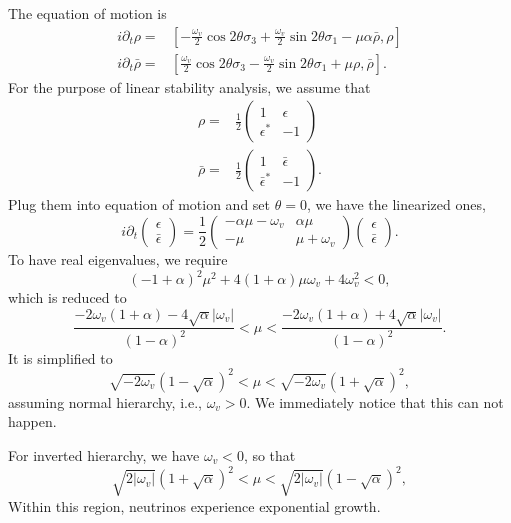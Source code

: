 The equation of motion is
\begin{align*}
   i\partial_t \rho =& \left[ -\frac{\omega_v}{2} \cos2\theta \sigma_3 + \frac{\omega_v}{2}\sin 2\theta \sigma_1 - \mu \alpha \bar \rho , \rho\right] \\
   i\partial_t \bar\rho =& \left[ \frac{\omega_v}{2} \cos2\theta \sigma_3 - \frac{\omega_v}{2}\sin 2\theta \sigma_1 + \mu \rho , \bar\rho\right].
\end{align*}
For the purpose of linear stability analysis, we assume that
\begin{align*}
   \rho =& \frac{1}{2}\begin{pmatrix}
   1 & \epsilon \\
   \epsilon^* & -1
   \end{pmatrix} \\
   \bar\rho =& \frac{1}{2}\begin{pmatrix}
   1 & \bar\epsilon \\
   \bar \epsilon^* & -1
   \end{pmatrix}.
\end{align*}
Plug them into equation of motion and set $\theta=0$, we have the linearized ones,
\begin{equation*}
   i\partial_t \begin{pmatrix}
   \epsilon \\
   \bar\epsilon
   \end{pmatrix} = \frac{1}{2}\begin{pmatrix}
   -\alpha \mu - \omega_v & \alpha \mu \\
   -\mu & \mu + \omega_v
   \end{pmatrix}\begin{pmatrix}
   \epsilon \\
   \bar\epsilon
   \end{pmatrix}.
\end{equation*}
To have real eigenvalues, we require
\begin{equation*}
   (-1+\alpha)^2 \mu^2 + 4(1+\alpha)\mu \omega_v + 4 \omega_v^2 < 0,
\end{equation*}
which is reduced to
\begin{equation*}
   \frac{ -2\omega_v (1+\alpha) - 4\sqrt{ \alpha } \lvert \omega_v \rvert  }{ (1-\alpha)^2 } < \mu < \frac{ -2\omega_v (1+\alpha) + 4\sqrt{ \alpha } \lvert \omega_v \rvert  }{ (1-\alpha)^2 }.
\end{equation*}
It is simplified to
\begin{equation*}
   \sqrt{ -2\omega_v }{ (1-\sqrt{\alpha})^2 } < \mu < \sqrt{ -2\omega_v }{ (1+\sqrt{\alpha})^2 },
\end{equation*}
assuming normal hierarchy, i.e., $\omega_v > 0$. We immediately notice that this can not happen.

For inverted hierarchy, we have $\omega_v < 0$, so that
\begin{equation*}
   \sqrt{ 2\lvert\omega_v\rvert }{ (1+\sqrt{\alpha})^2 } < \mu < \sqrt{ 2\lvert\omega_v\rvert }{ (1-\sqrt{\alpha})^2 },
\end{equation*}
Within this region, neutrinos experience exponential growth.


